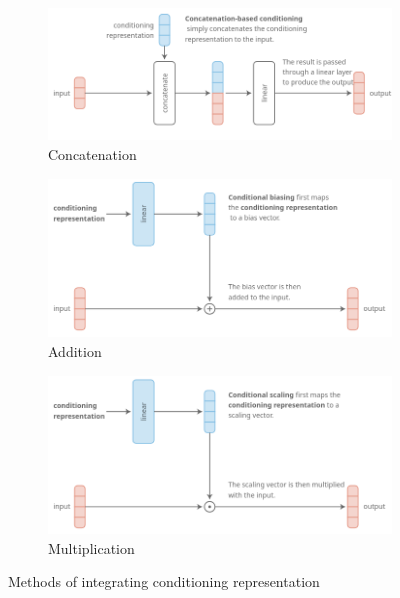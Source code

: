 \documentclass[12pt, a4paper]{article}
\begin{document}
\begin{figure}[h!]
    \centering
    \begin{subfigure}[t]{0.48\textwidth}
        \centering
        \includegraphics[width=\textwidth]{concat.png}
        \caption{Concatenation}
        \label{}
    \end{subfigure}
    \hfill
    \begin{subfigure}[t]{0.48\textwidth}
        \centering
        \includegraphics[width=\textwidth]{add.png}
        \caption{Addition}
        \label{}
    \end{subfigure}
    \begin{subfigure}[b]{.48\textwidth}
        \centering
        \includegraphics[width=\textwidth]{mul.png}
        \caption{Multiplication}
        \label{}
    \end{subfigure}    
    \caption{Methods of integrating conditioning representation \cite{ruderOverviewMultiTaskLearning2017}}
    \label{}
\end{figure}
\end{document}
